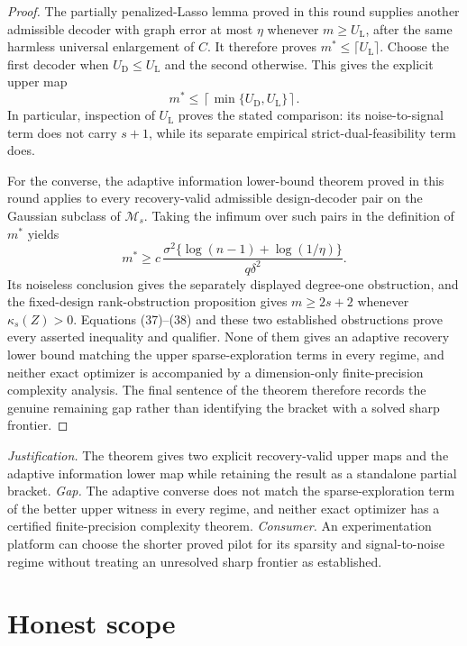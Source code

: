\documentclass{article}
\begin{document}
\begin{proof}
The partially penalized-Lasso lemma proved in this round supplies another admissible decoder with graph error at most \(\eta\) whenever \(m\ge U_{\mathrm L}\), after the same harmless universal enlargement of \(C\).  It therefore proves \(m^*\le\lceil U_{\mathrm L}\rceil\).  Choose the first decoder when \(U_{\mathrm D}\le U_{\mathrm L}\) and the second otherwise.  This gives the explicit upper map
\[
 m^*\le\left\lceil\min\{U_{\mathrm D},U_{\mathrm L}\}\right\rceil. \tag{37}
\]
In particular, inspection of \(U_{\mathrm L}\) proves the stated comparison: its noise-to-signal term does not carry \(s+1\), while its separate empirical strict-dual-feasibility term does.

For the converse, the adaptive information lower-bound theorem proved in this round applies to every recovery-valid admissible design-decoder pair on the Gaussian subclass of \(\mathcal M_s\).  Taking the infimum over such pairs in the definition of \(m^*\) yields
\[
 m^*\ge c\,\frac{\sigma^2\{\log(n-1)+\log(1/\eta)\}}{q\delta^2}. \tag{38}
\]
Its noiseless conclusion gives the separately displayed degree-one obstruction, and the fixed-design rank-obstruction proposition gives \(m\ge2s+2\) whenever \(\kappa_s(Z)>0\).  Equations (37)--(38) and these two established obstructions prove every asserted inequality and qualifier.  None of them gives an adaptive recovery lower bound matching the upper sparse-exploration terms in every regime, and neither exact optimizer is accompanied by a dimension-only finite-precision complexity analysis.  The final sentence of the theorem therefore records the genuine remaining gap rather than identifying the bracket with a solved sharp frontier.
\end{proof}
\par\smallskip\noindent \textit{Justification.} The theorem gives two explicit recovery-valid upper maps and the adaptive information lower map while retaining the result as a standalone partial bracket. \textit{Gap.} The adaptive converse does not match the sparse-exploration term of the better upper witness in every regime, and neither exact optimizer has a certified finite-precision complexity theorem. \textit{Consumer.} An experimentation platform can choose the shorter proved pilot for its sparsity and signal-to-noise regime without treating an unresolved sharp frontier as established.

\section{Honest scope}
\end{document}
